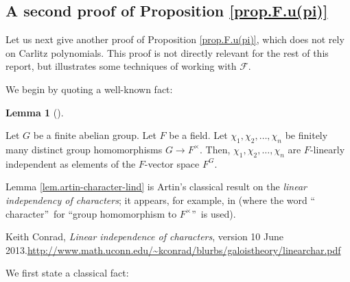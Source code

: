 \documentclass[numbers=enddot,12pt,final,onecolumn,notitlepage]{scrartcl}%
\theoremstyle{definition}
\newtheorem{lem}[theo]{Lemma}
\newenvironment{lemma}[1][]
{\begin{lem}[#1]\begin{leftbar}}
{\end{leftbar}\end{lem}}
\newenvironment{noncompile}{}{}
\begin{document}
\subsection{A second proof of Proposition \ref{prop.F.u(pi)}}

Let us next give another proof of Proposition \ref{prop.F.u(pi)}, which does
not rely on Carlitz polynomials. This proof is not directly relevant for the
rest of this report, but illustrates some techniques of working with
$\mathcal{F}$.

\begin{noncompile}
We begin by quoting a well-known fact:

\begin{lemma}
\label{lem.artin-character-lind}Let $G$ be a finite abelian group. Let $F$ be
a field. Let $\chi_{1},\chi_{2},\ldots,\chi_{n}$ be finitely many distinct
group homomorphisms $G\rightarrow F^{\times}$. Then, $\chi_{1},\chi_{2}%
,\ldots,\chi_{n}$ are $F$-linearly independent as elements of the $F$-vector
space $F^{G}$.
\end{lemma}

Lemma \ref{lem.artin-character-lind} is Artin's classical result on the
\textit{linear independency of characters}; it appears, for example, in
\cite[Theorem 2.1]{kc-lind} (where the word \textquotedblleft
character\textquotedblright\ for \textquotedblleft group homomorphism to
$F^{\times}$\textquotedblright\ is used).

Keith Conrad, \textit{Linear independence of characters},
version 10 June 2013.\newline\url{http://www.math.uconn.edu/~kconrad/blurbs/galoistheory/linearchar.pdf}
\end{noncompile}

We first state a classical fact:
\end{document}

